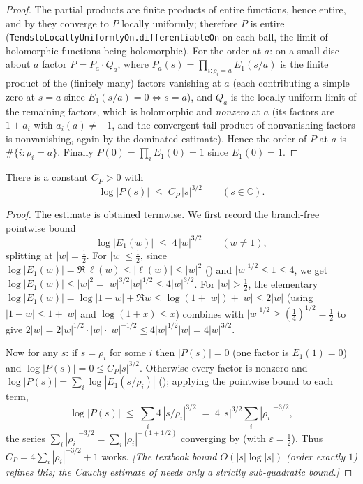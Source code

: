 \begin{proof}
\leanok
{}
The partial products are finite products of entire functions, hence entire, and by
 they converge to $P$ locally uniformly; therefore $P$ is
entire (\texttt{TendstoLocallyUniformlyOn.differentiableOn} on each ball, the limit
of holomorphic functions being holomorphic). For the order at $a$: on a small disc
about $a$ factor $P=P_{a}\cdot Q_a$, where $P_a(s)=\prod_{i:\rho_i=a}E_1(s/a)$ is the
finite product of the (finitely many) factors vanishing at $a$ (each contributing a
simple zero at $s=a$ since $E_1(s/a)=0\iff s=a$), and $Q_a$ is the locally uniform
limit of the remaining factors, which is holomorphic and \emph{nonzero} at $a$
(its factors are $1+a_i$ with $a_i(a)\neq-1$, and the convergent tail product of
nonvanishing factors is nonvanishing, again by the dominated estimate). Hence the
order of $P$ at $a$ is $\#\{i:\rho_i=a\}$. Finally $P(0)=\prod_i E_1(0)=1$ since
$E_1(0)=1$.
\end{proof}

\begin{lemma}
\label{lem:hf_prod_order}
\leanok
{}
There is a constant $C_P>0$ with
\[
  \log|P(s)|\;\le\;C_P\,|s|^{3/2}\qquad(s\in\mathbb C).
\]
\end{lemma}

\begin{proof}
\leanok
{}
The estimate is obtained termwise. We first record the branch-free pointwise bound
\[
  \log|E_1(w)|\;\le\;4\,|w|^{3/2}\qquad(w\neq1),
\]
splitting at $|w|=\tfrac12$. For $|w|\le\tfrac12$, since
$\log|E_1(w)|=\Re\,\ell(w)\le|\ell(w)|\le|w|^{2}$ () and
$|w|^{1/2}\le1\le4$, we get $\log|E_1(w)|\le|w|^{2}=|w|^{3/2}|w|^{1/2}\le4|w|^{3/2}$.
For $|w|>\tfrac12$, the elementary
$\log|E_1(w)|=\log|1-w|+\Re w\le\log(1+|w|)+|w|\le2|w|$ (using
$|1-w|\le1+|w|$ and $\log(1+x)\le x$) combines with $|w|^{1/2}\ge(\tfrac14)^{1/2}=\tfrac12$
to give $2|w|=2|w|^{1/2}\cdot|w|\cdot|w|^{-1/2}\le4|w|^{1/2}|w|=4|w|^{3/2}$.

Now for any $s$: if $s=\rho_i$ for some $i$ then $|P(s)|=0$ (one factor is
$E_1(1)=0$) and $\log|P(s)|=0\le C_P|s|^{3/2}$. Otherwise every factor is nonzero and
$\log|P(s)|=\sum_i\log|E_1(s/\rho_i)|$ (); applying the
pointwise bound to each term,
\[
  \log|P(s)|\;\le\;\sum_i 4\,|s/\rho_i|^{3/2}
   \;=\;4\,|s|^{3/2}\sum_i|\rho_i|^{-3/2},
\]
the series $\sum_i|\rho_i|^{-3/2}=\sum_i|\rho_i|^{-(1+1/2)}$ converging by
 (with $\varepsilon=\tfrac12$). Thus
$C_P=4\sum_i|\rho_i|^{-3/2}+1$ works. \emph{[The textbook bound $O(|s|\log|s|)$ (order
exactly $1$) refines this; the Cauchy estimate of  needs only a
strictly sub-quadratic bound.]}
\end{proof}

